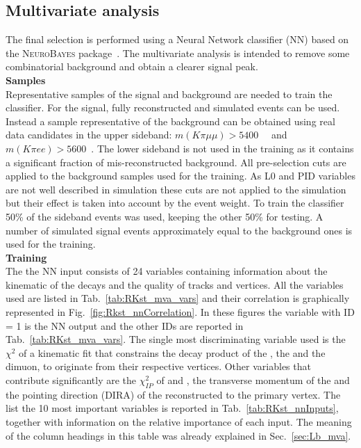 

\subsection{Multivariate analysis}
\label{sec:RKst_mva}

The final selection is performed using a Neural Network classifier (NN) based on the \textsc{NeuroBayes}
package~\cite{Feindt:2006pm,feindt-2004}. The multivariate analysis is intended to remove
some combinatorial background and obtain a clearer signal peak.
\\

{\bf Samples}
\\

Representative samples of the signal and background are needed to train the classifier.
For the signal, fully reconstructed \BdToKstmm and \BdKstee simulated events can be used.
Instead a sample representative of the background can be obtained using real data candidates
in the upper \Bz sideband: $m(K\pi\mu\mu) > 5400$~\mevcc~ and $m(K\pi ee) > 5600$~\mevcc.
The lower sideband is not used in the training as it contains a significant fraction of mis-reconstructed background.
All pre-selection cuts are applied to the background samples used for the training.
As L0 and PID variables are not well described in simulation these cuts are not applied to the simulation
but their effect is taken into account by the event weight.
To train the classifier 50\% of the sideband events was used, keeping the other 50\% for testing.
A number of simulated signal events approximately equal to the background ones is used for the training.
\\

{\bf Training}
\\

The the NN input consists of 24 variables containing information about the kinematic of the decays
and the quality of tracks and vertices. All the variables used are listed in Tab.~\ref{tab:RKst_mva_vars} and
their correlation is graphically represented in Fig.~\ref{fig:Rkst_nnCorrelation}.
In these figures the variable with ID = 1 is the NN output and the other IDs are reported in Tab.~\ref{tab:RKst_mva_vars}.
%
The single most discriminating variable used is the $\chi^2$ of a kinematic fit
that constrains the decay product of the \Bz, the \Kstarz and the dimuon, to originate from their respective vertices.
Other variables that contribute significantly are the $\chi^2_{IP}$ of \jpsi and \Kstarz, the transverse momentum
of the \Bz and the pointing direction (DIRA) of the reconstructed \Bz to the primary vertex.
The list the 10 most important variables is reported in Tab.~\ref{tab:RKst_nnInputs}, together
with information on the relative importance of each input. The meaning of the column headings
in this table was already explained in Sec.~\ref{sec:Lb_mva}.

